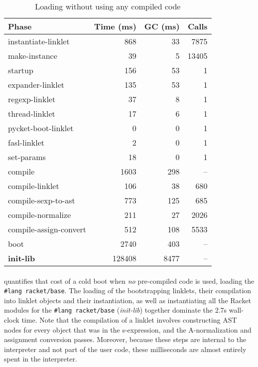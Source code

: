 		\vspace{1.5em}

		\begin{table}[!h]
		\centering
		\small
		\begin{tabular}{@{}lrrr@{}}
			\toprule
			Phase & Time (ms) & GC (ms) & Calls \\ \midrule
			instantiate-linklet            &    868 &   33 & 7875 \\
			make-instance                  &     39 &    5 & 13405 \\
			startup                        &    156 &   53 & 1 \\
			\quad expander-linklet         &    135 &   53 & 1 \\
			\quad regexp-linklet                 &     37 &    8 & 1 \\
			\quad thread-linklet                 &     17 &    6 & 1 \\
			\quad pycket-boot-linklet            &      0 &    0 & 1 \\
			\quad fasl-linklet             &      2 &    0 & 1 \\
			\quad set-params               &     18 &    0 & 1 \\ \midrule
			compile                        &   1603 &  298 & -- \\
			\quad compile-linklet          &    106 &   38 & 680 \\
			\quad compile-sexp-to-ast      &    773 &  125 & 685 \\
			\quad compile-normalize        &    211 &   27 & 2026 \\
			\quad compile-assign-convert   &    512 &  108 & 5533 \\ \midrule
			boot            		   	   &   2740 &  403 & -- \\
			\textbf{init-lib}			   &	128408 &   8477 & -- \\
			\bottomrule
		\end{tabular}
		\caption{Loading  without using any compiled code}
		\label{table:boot-no-compiled}
		\end{table}

		\paragraph{}%
			 quantifies that cost of a cold boot when \emph{no} pre-compiled code is used, loading the \texttt{\#lang racket/base}. The loading of the bootstrapping linklets, their compilation into linklet objects and their instantiation, as well as instantiating all the Racket modules for the \texttt{\#lang racket/base} (\emph{init-lib}) together dominate the 2.7s wall-clock time. Note that the compilation of a linklet involves constructing AST nodes for every object that was in the s-expression, and the A-normalization and assignment conversion passes. Moreover, because these steps are internal to the interpreter and not part of the user code, these milliseconds are almost entirely spent in the interpreter.

